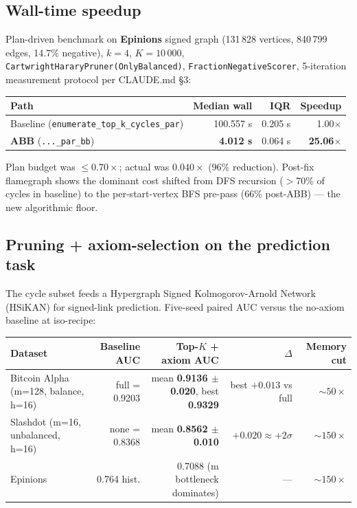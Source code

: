 \documentclass[11pt,a4paper]{article}
\newcommand{\code}[1]{\texttt{\small #1}}
\begin{document}
\subsection{Wall-time speedup}

Plan-driven benchmark on \textbf{Epinions} signed graph (131\,828
vertices, 840\,799 edges, 14.7\% negative), $k = 4$, $K = 10\,000$,
\code{CartwrightHararyPruner(OnlyBalanced)},
\code{FractionNegativeScorer}, 5-iteration measurement protocol per
CLAUDE.md \S 3:

\begin{center}\small
\begin{tabular}{lrrr}
\toprule
Path                                   & Median wall & IQR & Speedup \\
\midrule
Baseline (\code{enumerate\_top\_k\_cycles\_par})  & 100.557 s & 0.205 s & 1.00$\times$ \\
\textbf{ABB} (\code{...\_par\_bb})                & \textbf{4.012 s}  & 0.064 s & \textbf{25.06$\times$} \\
\bottomrule
\end{tabular}
\end{center}

Plan budget was $\leq 0.70\times$; actual was $0.040\times$ (96\%
reduction). Post-fix flamegraph shows the dominant cost shifted from
DFS recursion ($>$70\% of cycles in baseline) to the per-start-vertex
BFS pre-pass (66\% post-ABB) --- the new algorithmic floor.

\subsection{Pruning + axiom-selection on the prediction task}

The cycle subset feeds a Hypergraph Signed Kolmogorov-Arnold Network
(HSiKAN) for signed-link prediction. Five-seed paired AUC versus the
no-axiom baseline at iso-recipe:

\begin{center}\small
\begin{tabular}{lrrrr}
\toprule
Dataset                                       & Baseline AUC & Top-$K$ + axiom AUC & $\Delta$ & Memory cut \\
\midrule
Bitcoin Alpha (m{=}128, balance, h{=}16)      & full = 0.9203   & mean \textbf{0.9136 $\pm$ 0.020}, best \textbf{0.9329}   & best $+0.013$ vs full & $\sim 50\times$ \\
Slashdot (m{=}16, unbalanced, h{=}16)         & none = 0.8368  & mean \textbf{0.8562 $\pm$ 0.010}                         & $+0.020 \approx +2\sigma$ & $\sim 150\times$ \\
Epinions                                      & 0.764 hist.    & 0.7088 (m bottleneck dominates)                          & ---                  & $\sim 150\times$ \\
\bottomrule
\end{tabular}
\end{center}
\end{document}
